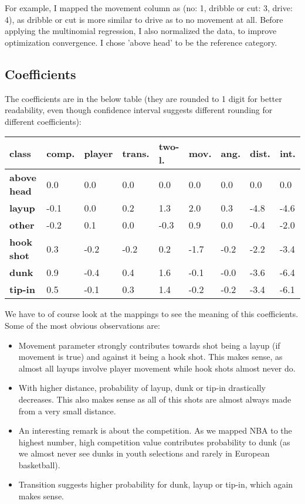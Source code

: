 \documentclass{article}
\begin{document}
For example, I mapped the movement column as (no: 1, dribble or cut: 3, drive: 4), as dribble or cut is more similar to drive as to no movement at all. Before applying the multinomial regression, I also normalized the data, to improve optimization convergence. I chose 'above head' to be the reference category. 

\subsection{Coefficients}

The coefficients are in the below table (they are rounded to 1 digit for better readability, even though confidence interval suggests different rounding for different coefficients):

\begin{table}[!ht]
    \centering
    \begin{tabular}{|l|l|l|l|l|l|l|l|l|}
    \hline
        class & comp. & player & trans. & two-l. & mov. & ang. & dist. & int. \\ \hline
        \textbf{above head} & 0.0 & 0.0 & 0.0 & 0.0 & 0.0 & 0.0 & 0.0 & 0.0 \\ \hline
        \textbf{layup} & -0.1 & 0.0 & 0.2 & 1.3 & 2.0 & 0.3 & -4.8 & -4.6 \\ \hline
        \textbf{other} & -0.2 & 0.1 & 0.0 & -0.3 & 0.9 & 0.0 & -0.4 & -2.0 \\ \hline
        \textbf{hook shot} & 0.3 & -0.2 & -0.2 & 0.2 & -1.7 & -0.2 & -2.2 & -3.4 \\ \hline
        \textbf{dunk} & 0.9 & -0.4 & 0.4 & 1.6 & -0.1 & -0.0 & -3.6 & -6.4 \\ \hline
        \textbf{tip-in} & 0.5 & -0.1 & 0.3 & 1.4 & -0.2 & -0.2 & -3.4 & -6.1 \\ \hline
    \end{tabular}
\end{table}

We have to of course look at the mappings to see the meaning of this coefficients. Some of the most obvious observations are:
\begin{itemize}
    \item Movement parameter strongly contributes towards shot being a layup (if movement is true) and against it being a hook shot. This makes sense, as almost all layups involve player movement while hook shots almost never do.
    \item With higher distance, probability of layup, dunk or tip-in drastically decreases. This also makes sense as all of this shots are almost always made from a very small distance. 
    \item An interesting remark is about the competition. As we mapped NBA to the highest number, high competition value contributes probability to dunk (as we almost never see dunks in youth selections and rarely in European basketball).
    \item Transition suggests higher probability for dunk, layup or tip-in, which again makes sense.
\end{itemize}
\end{document}
